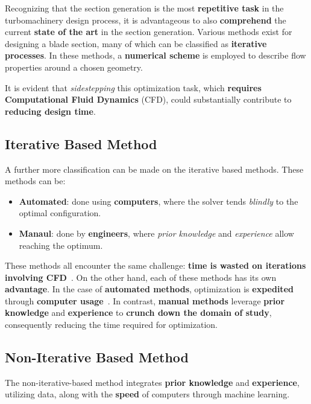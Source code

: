 Recognizing that the section generation is the most \textbf{repetitive task} in the turbomachinery design process, 
it is advantageous to also \textbf{comprehend} the current \textbf{state of the art} in the section generation. 
Various methods exist for designing a blade section, many of which can be classified as \textbf{iterative processes}. 
In these methods, a \textbf{numerical scheme} is employed to describe flow properties around a chosen geometry.

It is evident that \textit{sidestepping} this optimization task, which \textbf{requires Computational Fluid Dynamics} (CFD), 
could substantially contribute to \textbf{reducing design time}.

\subsection{Iterative Based Method}

A further more classification can be made on the iterative based methods. 
These methods can be:

\begin{itemize}
    \item \textbf{Automated}: done using \textbf{computers}, where the solver tends \textit{blindly} to the optimal configuration.
    \item \textbf{Manaul}: done by \textbf{engineers}, where \textit{prior knowledge} and \textit{experience} allow reaching the optimum.
\end{itemize}

These methods all encounter the same challenge: \textbf{time is wasted on iterations involving CFD}~\cite{denton2010some}. 
On the other hand, each of these methods has its own \textbf{advantage}. In the case of \textbf{automated methods}, optimization is \textbf{expedited} through \textbf{computer usage}~\cite{shahpar2004review}. 
In contrast, \textbf{manual methods} leverage \textbf{prior knowledge} and \textbf{experience} to \textbf{crunch down the domain of study}, consequently reducing the time required for optimization.

\subsection{Non-Iterative Based Method}

The non-iterative-based method integrates \textbf{prior knowledge} and \textbf{experience}, utilizing data, along with the \textbf{speed} of computers through machine learning.

